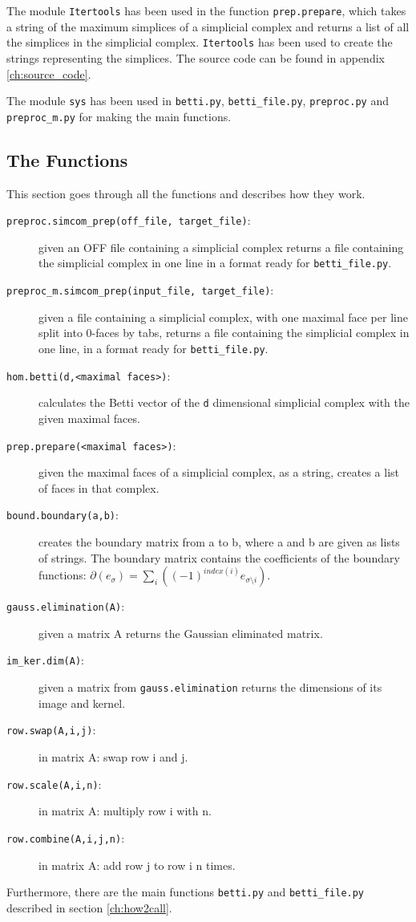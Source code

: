 \documentclass[11pt,a4paper,twoside]{report}
\begin{document}
The module \texttt{Itertools} has been used in the function \texttt{prep.prepare}, which takes a string of the maximum simplices of a simplicial complex and returns a list of all the simplices in the simplicial complex. \texttt{Itertools} has been used to create the strings representing the simplices. The source code can be found in appendix \ref{ch:source_code}.

The module \texttt{sys} has been used in \texttt{betti.py}, \texttt{betti\_file.py}, \texttt{preproc.py} and \newline \texttt{preproc\_m.py} for making the main functions.

\subsection{The Functions}

This section goes through all the functions and describes how they work.

\begin{description}
\item[\texttt{preproc.simcom\_prep(off\_file, target\_file)}:] given an OFF file containing a simplicial complex returns a file containing the simplicial complex in one line in a format ready for \texttt{betti\_file.py}. 
\item[\texttt{preproc\_m.simcom\_prep(input\_file, target\_file)}:] given a file containing a simplicial complex, with one maximal face per line split into 0-faces by tabs, returns a file containing the simplicial complex in one line, in a format ready for \texttt{betti\_file.py}.
\item[\texttt{hom.betti(d,<maximal faces>)}:] calculates the Betti vector of the \texttt{d} dimensional simplicial complex with the given maximal faces.
\item[\texttt{prep.prepare(<maximal faces>)}:] given the maximal faces of a simplicial complex, as a string, creates a list of faces in that complex.
\item[\texttt{bound.boundary(a,b)}:]creates the boundary matrix from a to b, where a and b are given as lists of strings. The boundary matrix contains the coefficients of the boundary functions: $\partial(e_{\sigma}) = \sum_i((-1)^{index(i)}e_{\sigma\setminus i})$.
\item[\texttt{gauss.elimination(A)}:] given a matrix A returns the Gaussian eliminated matrix.
\item[\texttt{im\_ker.dim(A)}:] given a matrix from \texttt{gauss.elimination} returns the dimensions of its image and kernel.
\item[\texttt{row.swap(A,i,j)}:] in matrix A: swap row i and j.
\item[\texttt{row.scale(A,i,n)}:] in matrix A: multiply row i with n.
\item[\texttt{row.combine(A,i,j,n)}:] in matrix A: add row j to row i n times.
\end{description}
Furthermore, there are the main functions \texttt{betti.py} and \texttt{betti\_file.py} described in section \ref{ch:how2call}.
\end{document}
